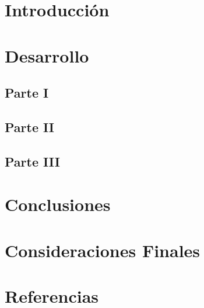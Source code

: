 \documentclass{extbook}
\begin{document}

\tableofcontents
\listoffigures
\chapter{Introducción}

\chapter{Desarrollo}
\section{Parte I}

\section{Parte II}

\section{Parte III}

\chapter{Conclusiones}

\chapter{Consideraciones Finales}
\chapter{Referencias}

\end{document}
